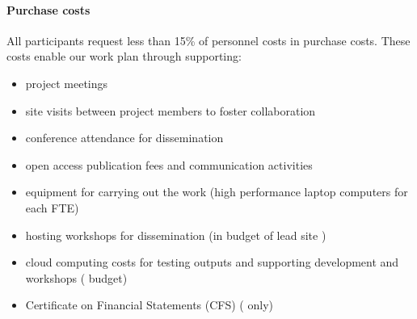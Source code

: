 \paragraph*{Purchase costs} All participants request less than 15\% of personnel costs in purchase costs.
These costs enable our work plan through supporting: 
\begin{itemize}[noitemsep]
\item project meetings
\item site visits between project members to foster collaboration
\item conference attendance for dissemination
\item open access publication fees and communication activities
\item equipment for carrying out the work (high performance laptop computers for each FTE)
\item hosting workshops for dissemination (in budget of lead site )
\item cloud computing costs for testing outputs and supporting development and workshops ( budget)
\item Certificate on Financial Statements (CFS) ( only)
\end{itemize}


